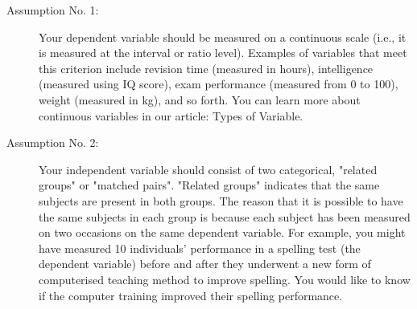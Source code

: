 \documentclass[]{article}
\begin{document}
\begin{description}
	\item[ Assumption No. 1:] Your dependent variable should be measured on a continuous scale (i.e., it is measured at the interval or ratio level). Examples of variables that meet this criterion include revision time (measured in hours), intelligence (measured using IQ score), exam performance (measured from 0 to 100), weight (measured in kg), and so forth. You can learn more about continuous variables in our article: Types of Variable.
	\item[ Assumption No. 2:] Your independent variable should consist of two categorical, "related groups" or "matched pairs". "Related groups" indicates that the same subjects are present in both groups. The reason that it is possible to have the same subjects in each group is because each subject has been measured on two occasions on the same dependent variable. For example, you might have measured 10 individuals' performance in a spelling test (the dependent variable) before and after they underwent a new form of computerised teaching method to improve spelling. You would like to know if the computer training improved their spelling performance. 
	

\end{description}
\end{document}

